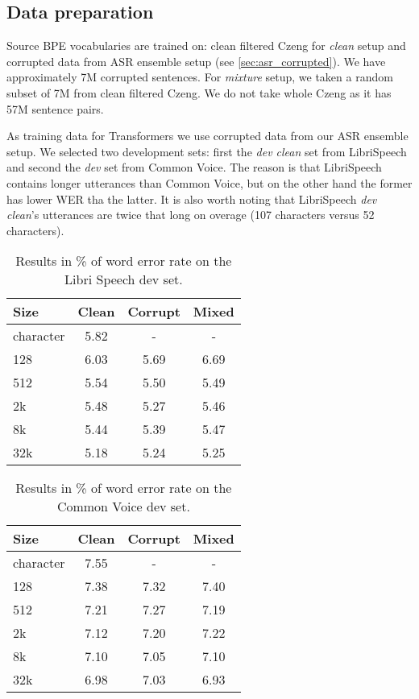\subsection{Data preparation}
Source BPE vocabularies are trained on: clean filtered Czeng for \textit{clean} setup and corrupted data from ASR ensemble setup (see \cref{sec:asr_corrupted}). We have approximately 7M corrupted sentences. For \textit{mixture} setup, we taken a random subset of 7M from clean filtered Czeng. We do not take whole Czeng as it has 57M sentence pairs. 

As training data for Transformers we use corrupted data from our ASR ensemble setup. We selected two development sets: first the \textit{dev clean} set from LibriSpeech and second the \textit{dev} set from Common Voice. The reason is that LibriSpeech contains longer utterances than Common Voice, but on the other hand the former has lower WER tha the latter. It is also worth noting that LibriSpeech \textit{dev clean}'s utterances are twice that long on overage (107 characters versus 52 characters).


\begin{table}[p]
	\centering
	\begin{tabular}{l|ccc}
		\bf Size & \bf Clean & \bf Corrupt & \bf Mixed \\
		\hline
	character &  5.82  &  -  &  -  \\
	128 &  6.03  &  5.69  &  6.69  \\
	512 &    5.54  &  5.50   &  5.49 \\
	2k &  5.48  & 5.27  & 5.46  \\
	8k &  5.44  &   5.39 & 5.47  \\
	32k &  5.18  & 5.24  &  5.25 \\
		
	\end{tabular}
	\caption{Results in \% of word error rate on the Libri Speech dev set.}
	\label{tab:results_vocabularies_libri}
\end{table}
	
\begin{table}[p]
	\centering
	\begin{tabular}{l|ccc}
		\bf Size & \bf Clean & \bf Corrupt & \bf Mixed \\
		\hline
		character &  7.55  &  -  &  -  \\
		128 & 7.38   &  7.32  & 7.40  \\
		512 &  7.21  & 7.27   & 7.19  \\
		2k & 7.12   & 7.20 & 7.22  \\
		8k &  7.10  & 7.05  & 7.10  \\
		32k &  6.98  & 7.03  &  6.93 \\
		
	\end{tabular}
\caption{Results in \% of word error rate on the Common Voice dev set.}
\label{tab:results_vocabularies_common}
\end{table}


